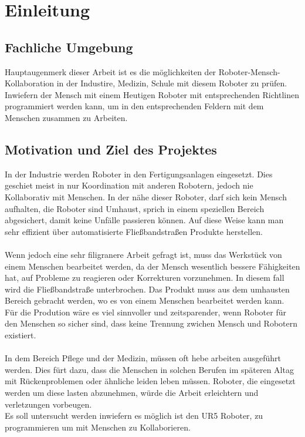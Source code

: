 \chapter{Einleitung}
\label{einleitung}

\section{Fachliche Umgebung}
\label{fachliche_domaene}

Hauptaugenmerk dieser Arbeit ist es die möglichkeiten der Roboter-Mensch-Kollaboration
in der Industire, Medizin, Schule mit diesem Roboter zu prüfen.
Inwiefern der Mensch mit einem Heutigen Roboter mit entsprechenden Richtlinen programmiert werden kann, um in den entsprechenden Feldern mit dem Menschen zusammen zu Arbeiten.

\section{Motivation und Ziel des Projektes}
\label{projektziel_motivation}

In der Industrie werden Roboter in den Fertigungsanlagen eingesetzt. 
Dies geschiet meist in nur Koordination mit anderen Robotern, jedoch nie Kollaborativ mit Menschen. In der nähe dieser Roboter, darf sich kein Mensch aufhalten, die Roboter sind Umhaust, sprich in einem speziellen Bereich abgesichert, damit keine Unfälle passieren können. 
Auf diese Weise kann man sehr effizient über automatisierte Fließbandstraßen Produkte herstellen.
\\\\
Wenn jedoch eine sehr filigranere Arbeit gefragt ist, muss das Werkstück von einem Menschen bearbeitet werden, da der Mensch wesentlich bessere Fähigkeiten hat, auf Probleme zu reagieren oder Korrekturen vorzunehmen. In diesem fall wird die Fließbandstraße unterbrochen. Das Produkt muss aus dem umhausten Bereich gebracht werden, wo es von einem Menschen bearbeitet werden kann.
\\
Für die Prodution wäre es viel sinnvoller und zeitsparender, wenn Roboter für den Menschen so sicher sind, dass keine Trennung zwichen Mensch und Robotern existiert.
\\\\
In dem Bereich Pflege und der Medizin, müssen oft hebe arbeiten ausgeführt werden. Dies fürt dazu, dass die Menschen in solchen Berufen im späteren Altag mit Rückenproblemen oder ähnliche leiden leben müssen. Roboter, die eingesetzt werden um diese lasten abzunehmen, würde die Arbeit erleichtern und verletzungen vorbeugen.
\\
Es soll untersucht werden inwiefern es möglich ist den UR5 Roboter, zu programmieren um mit Menschen zu Kollaborieren.

